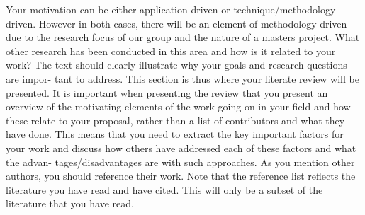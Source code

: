   Your motivation can be either application driven or technique/methodology driven.
  However in both cases, there will be an element of methodology driven due to
  the research focus of our group and the nature of a masters project. What other
  research has been conducted in this area and how is it related to your work? The
  text should clearly illustrate why your goals and research questions are impor-
  tant to address. This section is thus where your literate review will be presented.
  It is important when presenting the review that you present an overview of the
  motivating elements of the work going on in your field and how these relate to
  your proposal, rather than a list of contributors and what they have done. This
  means that you need to extract the key important factors for your work and
  discuss how others have addressed each of these factors and what the advan-
  tages/disadvantages are with such approaches. As you mention other authors,
  you should reference their work. Note that the reference list reflects the literature
  you have read and have cited. This will only be a subset of the literature that
  you have read.
\fi